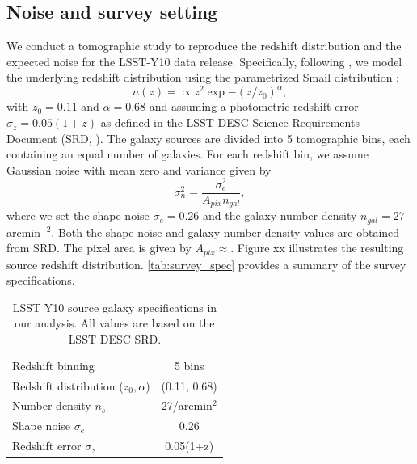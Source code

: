 \documentclass{aa}
\begin{document}
\subsection{Noise and survey setting}
We conduct a tomographic study to reproduce the redshift distribution and the expected noise for the LSST-Y10 data release.
Specifically, following \citet{zhang2022transitioning}, we model the underlying redshift distribution using the parametrized Smail distribution \citep{smail1995deep}:
\begin{equation}
    n(z)=\propto z^2 \exp{-(z/z_0)^{\alpha}},
\end{equation}
with $z_0=0.11$ and $\alpha=0.68$ and assuming a photometric redshift error $\sigma_z=0.05(1+z)$ as defined in the LSST DESC Science Requirements Document (SRD, \citet{mandelbaum2018lsst}).
The galaxy sources are divided into 5 tomographic bins, each containing an equal number of galaxies. 
For each redshift bin, we assume Gaussian noise with mean zero and variance given by
 \begin{equation}
     \sigma^2_n= \frac{\sigma_e^2}{A_{pix}n_{gal}},
 \end{equation}
where we set the shape noise $\sigma_e = 0.26$ and the galaxy number density $n_{gal}=27$ arcmin$^{-2}$. Both the shape noise and galaxy number density values are obtained from SRD. The pixel area is given by $A_{pix}\approx$. 
Figure  xx illustrates the resulting source redshift distribution. \autoref{tab:survey_spec} provides a summary of the survey specifications.
\begin{table}
	\centering
	\caption{ LSST Y10 source galaxy specifications in our analysis. All values are based on the LSST DESC SRD.}
	\begin{tabular}{lc} 
             \hline \hline
		Redshift binning & 5 bins \\
		Redshift distribution ($z_{0}, \alpha$) & (0.11, 0.68)  \\
		Number density $n_s$ & 27/arcmin$^2$ \\
		Shape noise $\sigma_e$ & 0.26 \\
		Redshift error $\sigma_z$ &0.05(1+z)  \\
		\hline
	\end{tabular}
	\label{tab:survey_spec}
\end{table}
\end{document}
